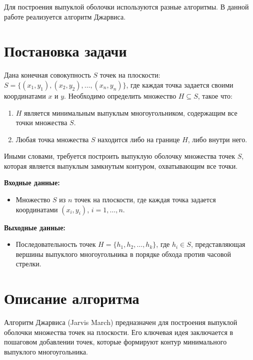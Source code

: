 \documentclass[a4paper,12pt]{article}
\begin{document}
Для построения выпуклой оболочки используются разные алгоритмы. В данной работе реализуется алгоритм Джарвиса.

\newpage

\section{Постановка задачи}
Дана конечная совокупность $S$ точек на плоскости: $S = \{(x_1, y_1), (x_2, y_2), \dots, (x_n, y_n)\}$, где каждая точка задается своими координатами $x$ и $y$. Необходимо определить множество $H \subseteq S$, такое что:
\begin{enumerate}
    \item $H$ является минимальным выпуклым многоугольником, содержащим все точки множества $S$.
    \item Любая точка множества $S$ находится либо на границе $H$, либо внутри него.
\end{enumerate}

Иными словами, требуется построить выпуклую оболочку множества точек $S$, которая является выпуклым замкнутым контуром, охватывающим все точки.

\textbf{Входные данные:}
\begin{itemize}
    \item Множество $S$ из $n$ точек на плоскости, где каждая точка задается координатами $(x_i, y_i)$, $i = 1, \ldots, n$.
\end{itemize}

\textbf{Выходные данные:}
\begin{itemize}
    \item Последовательность точек $H = \{ h_1, h_2, \ldots, h_k \}$, где $h_i \in S$, представляющая вершины выпуклого многоугольника в порядке обхода против часовой стрелки.
\end{itemize}

\newpage

\section{Описание алгоритма}
Алгоритм Джарвиса (Jarvis March) предназначен для построения выпуклой оболочки множества точек на плоскости. Его ключевая идея заключается в пошаговом добавлении точек, которые формируют контур минимального выпуклого многоугольника.
\end{document}
